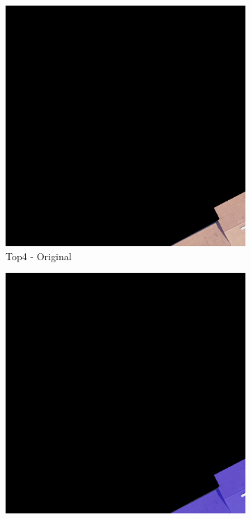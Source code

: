 \begin{figure}[H]
\begin{subfigure}{0.32\textwidth}
    \includegraphics[width=\textwidth]{02-main//figures/ch4/kfold_ensembles/unet_tu-mambaout_small/best_cases/best_2_iou0.984_24931113_tile_13_18_a66e08_original.png}
    \caption{Top4 - Original}
\end{subfigure}
\hfill
\begin{subfigure}{0.32\textwidth}
    \includegraphics[width=\textwidth]{02-main//figures/ch4/kfold_ensembles/unet_tu-mambaout_small/best_cases/best_2_iou0.984_24931113_tile_13_18_a66e08_overlay_gt.png}

\end{subfigure}
\end{figure}
